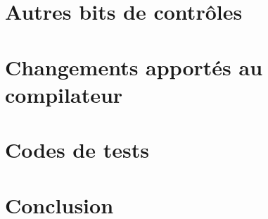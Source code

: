\documentclass[twoside, 12pt, a4paper]{article}
\begin{document}
\clearpage

\section{Autres bits de contrôles}

\clearpage

\section{Changements apportés au compilateur}

\clearpage

\section{Codes de tests}

\clearpage

\section*{Conclusion}
\end{document}
